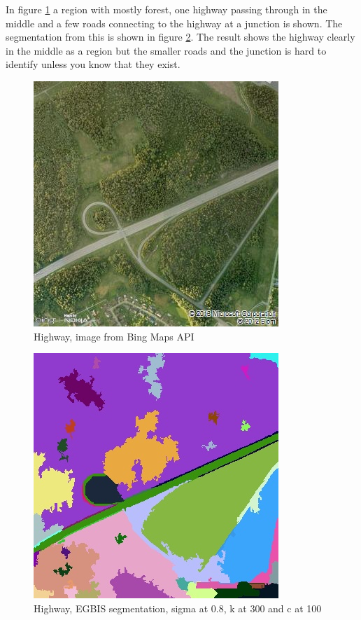 In figure \ref{fig:roadOriginal} a region with mostly forest, one highway passing
through in the middle and a few roads connecting to the highway at a junction is shown.
The segmentation from this is shown in figure \ref{fig:roadEGBIS}. The result shows
the highway clearly in the middle as a region but the smaller roads and the junction
is hard to identify unless you know that they exist.
\begin{figure}[ht]
    \begin{minipage}[t]{\linewidth}
        \centering
        \includegraphics[width=\textwidth]{images/bing/road-original.jpg}
        \caption{Highway, image from Bing Maps API}
        \label{fig:roadOriginal}
    \end{minipage}
\end{figure}
\begin{figure}[ht]
    \begin{minipage}[t]{\linewidth}
        \centering
        \includegraphics[width=\textwidth]{images/bing/road-egbis.jpg}
        \caption{Highway, EGBIS segmentation, sigma at 0.8, k at 300 and c at 100}
        \label{fig:roadEGBIS}
    \end{minipage}
\end{figure}
